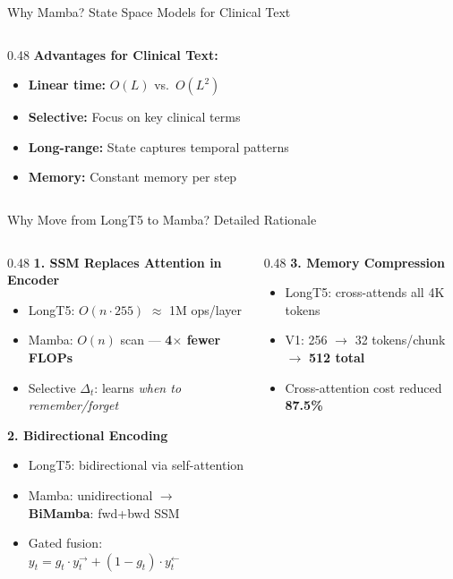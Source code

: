 \documentclass[10pt, aspectratio=169]{beamer}
\begin{document}
\begin{frame}{Why Mamba? State Space Models for Clinical Text}
\begin{columns}[T]
\begin{column}{0.48\textwidth}
      \vspace{0.05cm}
      \textbf{Advantages for Clinical Text:}
      \begin{itemize}\setlength{\itemsep}{0pt}
        \item \textbf{Linear time:} $O(L)$ vs.\ $O(L^2)$
        \item \textbf{Selective:} Focus on key clinical terms
        \item \textbf{Long-range:} State captures temporal patterns
        \item \textbf{Memory:} Constant memory per step
      \end{itemize}
    \end{column}
  \end{columns}
\end{frame}

\begin{frame}{Why Move from LongT5 to Mamba? Detailed Rationale}
  \footnotesize
  \begin{columns}[T]
    \begin{column}{0.48\textwidth}
      \textbf{1. SSM Replaces Attention in Encoder}
      \begin{itemize}\setlength{\itemsep}{0pt}
        \item LongT5: $O(n{\cdot}255)$ $\approx$ 1M ops/layer
        \item Mamba: $O(n)$ scan --- \textbf{4$\times$ fewer FLOPs}
        \item Selective $\Delta_t$: learns \emph{when to remember/forget}
      \end{itemize}

      \vspace{0.05cm}
      \textbf{2. Bidirectional Encoding}
      \begin{itemize}\setlength{\itemsep}{0pt}
        \item LongT5: bidirectional via self-attention
        \item Mamba: unidirectional $\rightarrow$ \textbf{BiMamba}: fwd+bwd SSM
        \item Gated fusion: $y_t = g_t{\cdot}y_t^{\rightarrow} + (1{-}g_t){\cdot}y_t^{\leftarrow}$
      \end{itemize}
    \end{column}
    \begin{column}{0.48\textwidth}
      \textbf{3. Memory Compression}
      \begin{itemize}\setlength{\itemsep}{0pt}
        \item LongT5: cross-attends all 4K tokens
        \item V1: 256 $\rightarrow$ 32 tokens/chunk $\rightarrow$ \textbf{512 total}
        \item Cross-attention cost reduced \textbf{87.5\%}
      \end{itemize}


\end{column}
\end{columns}
\end{frame}
\end{document}
